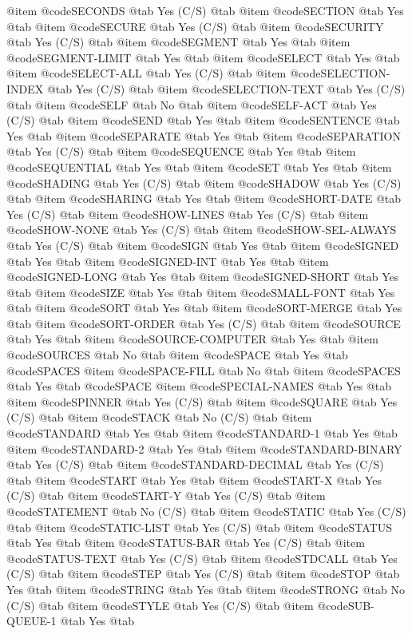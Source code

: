@item @code{SECONDS} @tab Yes	(C/S) @tab
@item @code{SECTION} @tab Yes @tab
@item @code{SECURE} @tab Yes	(C/S) @tab
@item @code{SECURITY} @tab Yes	(C/S) @tab
@item @code{SEGMENT} @tab Yes @tab
@item @code{SEGMENT-LIMIT} @tab Yes @tab
@item @code{SELECT} @tab Yes @tab
@item @code{SELECT-ALL} @tab Yes	(C/S) @tab
@item @code{SELECTION-INDEX} @tab Yes	(C/S) @tab
@item @code{SELECTION-TEXT} @tab Yes	(C/S) @tab
@item @code{SELF} @tab No @tab
@item @code{SELF-ACT} @tab Yes	(C/S) @tab
@item @code{SEND} @tab Yes @tab
@item @code{SENTENCE} @tab Yes @tab
@item @code{SEPARATE} @tab Yes @tab
@item @code{SEPARATION} @tab Yes	(C/S) @tab
@item @code{SEQUENCE} @tab Yes @tab
@item @code{SEQUENTIAL} @tab Yes @tab
@item @code{SET} @tab Yes @tab
@item @code{SHADING} @tab Yes	(C/S) @tab
@item @code{SHADOW} @tab Yes	(C/S) @tab
@item @code{SHARING} @tab Yes @tab
@item @code{SHORT-DATE} @tab Yes	(C/S) @tab
@item @code{SHOW-LINES} @tab Yes	(C/S) @tab
@item @code{SHOW-NONE} @tab Yes	(C/S) @tab
@item @code{SHOW-SEL-ALWAYS} @tab Yes	(C/S) @tab
@item @code{SIGN} @tab Yes @tab
@item @code{SIGNED} @tab Yes @tab
@item @code{SIGNED-INT} @tab Yes @tab
@item @code{SIGNED-LONG} @tab Yes @tab
@item @code{SIGNED-SHORT} @tab Yes @tab
@item @code{SIZE} @tab Yes @tab
@item @code{SMALL-FONT} @tab Yes @tab
@item @code{SORT} @tab Yes @tab
@item @code{SORT-MERGE} @tab Yes @tab
@item @code{SORT-ORDER} @tab Yes	(C/S) @tab
@item @code{SOURCE} @tab Yes @tab
@item @code{SOURCE-COMPUTER} @tab Yes @tab
@item @code{SOURCES} @tab No @tab
@item @code{SPACE} @tab Yes @tab @code{SPACES}
@item @code{SPACE-FILL} @tab No @tab
@item @code{SPACES} @tab Yes @tab @code{SPACE}
@item @code{SPECIAL-NAMES} @tab Yes @tab
@item @code{SPINNER} @tab Yes	(C/S) @tab
@item @code{SQUARE} @tab Yes	(C/S) @tab
@item @code{STACK} @tab No	(C/S) @tab
@item @code{STANDARD} @tab Yes @tab
@item @code{STANDARD-1} @tab Yes @tab
@item @code{STANDARD-2} @tab Yes @tab
@item @code{STANDARD-BINARY} @tab Yes	(C/S) @tab
@item @code{STANDARD-DECIMAL} @tab Yes	(C/S) @tab
@item @code{START} @tab Yes @tab
@item @code{START-X} @tab Yes	(C/S) @tab
@item @code{START-Y} @tab Yes	(C/S) @tab
@item @code{STATEMENT} @tab No	(C/S) @tab
@item @code{STATIC} @tab Yes	(C/S) @tab
@item @code{STATIC-LIST} @tab Yes	(C/S) @tab
@item @code{STATUS} @tab Yes @tab
@item @code{STATUS-BAR} @tab Yes	(C/S) @tab
@item @code{STATUS-TEXT} @tab Yes	(C/S) @tab
@item @code{STDCALL} @tab Yes	(C/S) @tab
@item @code{STEP} @tab Yes	(C/S) @tab
@item @code{STOP} @tab Yes @tab
@item @code{STRING} @tab Yes @tab
@item @code{STRONG} @tab No	(C/S) @tab
@item @code{STYLE} @tab Yes	(C/S) @tab
@item @code{SUB-QUEUE-1} @tab Yes @tab
